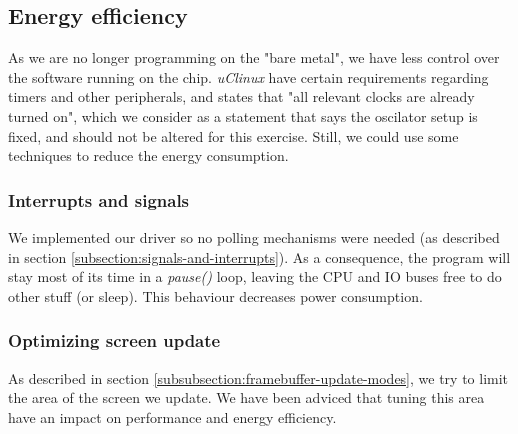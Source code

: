\subsection{Energy efficiency}
\label{subsection:energy-efficiency}
As we are no longer programming on the "bare metal", we have less control over the software running on the chip. \emph{uClinux} have certain requirements regarding timers and other peripherals, and \cite{compendium} states that "all relevant clocks are already turned on", which we consider as a statement that says the oscilator setup is fixed, and should not be altered for this exercise. Still, we could use some techniques to reduce the energy consumption.

\subsubsection{Interrupts and signals}
We implemented our driver so no polling mechanisms were needed (as described in section \ref{subsection:signals-and-interrupts}). As a consequence, the program will stay most of its time in a \emph{pause()} loop, leaving the CPU and IO buses free to do other stuff (or  sleep). This behaviour decreases power consumption.

\subsubsection{Optimizing screen update}
As described in section \ref{subsubsection:framebuffer-update-modes}, we try to limit the area of the screen we update. We have been adviced that tuning this area have an impact on performance and energy efficiency.

